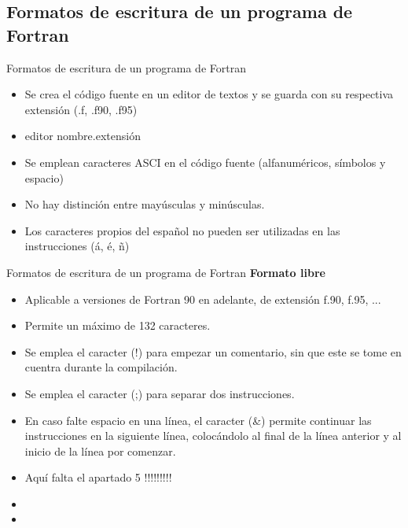 
\subsection{Formatos de escritura de un programa de Fortran}

\begin{frame}[fragile]{Formatos de escritura de un programa de Fortran}
  \begin{itemize}[<+(1)->]
  \item Se crea el código fuente en un editor de textos y se guarda con su respectiva extensión (.f, .f90, .f95)
  \item [] \begin{mintedbash} 
            editor nombre.extensión
           \end{mintedbash}
  \item Se emplean caracteres ASCI en el código fuente (alfanuméricos, símbolos y espacio)
  \item No hay distinción entre mayúsculas y minúsculas.
  \item Los caracteres propios del español no pueden ser utilizadas en las instrucciones (á, é, ñ)
  \end{itemize}
\end{frame}

\begin{frame}[fragile]{Formatos de escritura de un programa de Fortran}
 \textbf{Formato libre}
  \begin{itemize}[<+(1)->]
   \item Aplicable a versiones de Fortran 90 en adelante, de extensión f.90, f.95, ...
   \item Permite un máximo de 132 caracteres.
   \item Se emplea el caracter (!) para empezar un comentario, sin que este se tome en cuentra durante la compilación.
   \item Se emplea el caracter (;) para separar dos instrucciones.
   \item En caso falte espacio en una línea, el caracter (\&) permite continuar las instrucciones en la siguiente línea, colocándolo al final de la línea anterior y al inicio de la línea por comenzar.
   \item Aquí falta el apartado 5 !!!!!!!!!
   \item 
   \item 
  \end{itemize}
\end{frame}

